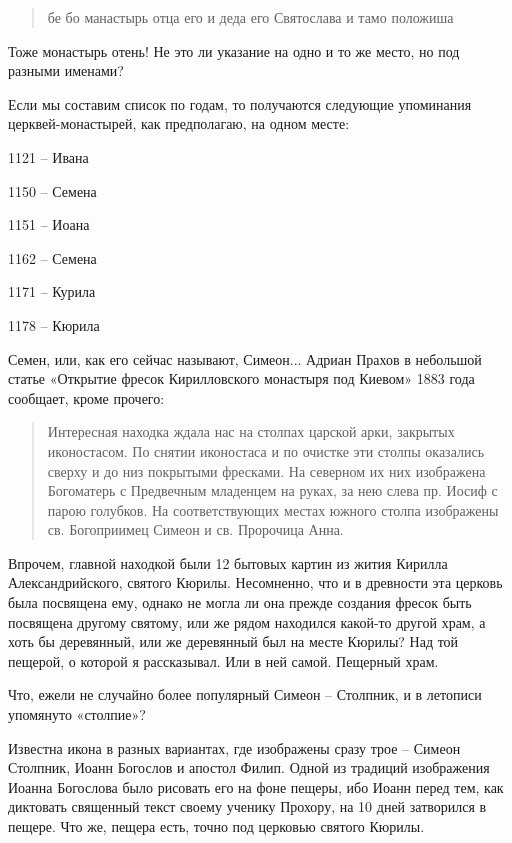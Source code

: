 \begin{quotation}
бе бо манастырь отца его и деда его Святослава и тамо положиша
\end{quotation}

Тоже монастырь отень! Не это ли указание на одно и то же место, но под разными именами?

Если мы составим список по годам, то получаются следующие упоминания церквей-монастырей, как предполагаю, на одном месте:

\medskip

1121 – Ивана

1150 – Семена

1151 – Иоана

1162 – Семена

1171 – Курила

1178 – Кюрила

\medskip

Семен, или, как его сейчас называют, Симеон... Адриан Прахов в небольшой статье «Открытие фресок Кирилловского монастыря под Киевом» 1883 года сообщает, кроме прочего:

\begin{quotation}
Интересная находка ждала нас на столпах царской арки, закрытых иконостасом. По снятии иконостаса и по очистке эти столпы оказались сверху и до низ покрытыми фресками. На северном их них изображена Богоматерь с Предвечным младенцем на руках, за нею слева пр. Иосиф с парою голубков. На соответствующих местах южного столпа изображены св. Богоприимец Симеон и св. Пророчица Анна.
\end{quotation}

Впрочем, главной находкой были 12 бытовых картин из жития Кирилла Александрийского, святого Кюрилы. Несомненно, что и в древности эта церковь была посвящена ему, однако не могла ли она прежде создания фресок быть посвящена другому святому, или же рядом находился какой-то другой храм, а хоть бы деревянный, или же деревянный был на месте Кюрилы? Над той пещерой, о которой я рассказывал. Или в ней самой. Пещерный храм.

Что, ежели не случайно более популярный Симеон – Столпник, и в летописи упомянуто «столпие»?

Известна икона в разных вариантах, где изображены сразу трое – Симеон Столпник, Иоанн Богослов и апостол Филип. Одной из традиций изображения Иоанна Богослова было рисовать его на фоне пещеры, ибо Иоанн перед тем, как диктовать священный текст своему ученику Прохору, на 10 дней затворился в пещере. Что же, пещера есть, точно под церковью святого Кюрилы.

